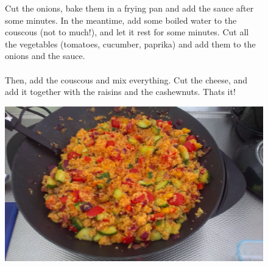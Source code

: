 \documentclass[a4paper,12pt]{report}
\begin{document}
\begin{figure}[h]

\begin{minipage}{0.6\textwidth}
Cut the onions, bake them in a frying pan and add the sauce after some minutes. In the meantime, add some boiled water to the couscous (not to much!), and let it rest for some minutes. Cut all the vegetables (tomatoes, cucumber, paprika) and add them to the onions and the sauce. \\
\\
Then, add the couscous and mix everything. Cut the cheese, and add it together with the raisins and the cashewnuts. Thats it! 
\end{minipage}
\begin{minipage}{0.35\textwidth}
	\includegraphics[scale=0.065]{Images/couscous.jpg}
\end{minipage}
\end{figure}
\end{document}
